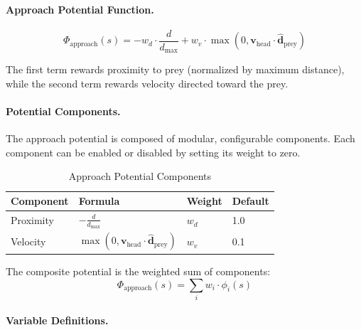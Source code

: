 \documentclass[11pt]{article}
\begin{document}
\paragraph{Approach Potential Function.}
\begin{equation}
    \Phi_{\text{approach}}(s) = -w_d \cdot \frac{d}{d_{\max}} + w_v \cdot \max(0, \mathbf{v}_{\text{head}} \cdot \hat{\mathbf{d}}_{\text{prey}})
\end{equation}

The first term rewards proximity to prey (normalized by maximum distance), while the second term rewards velocity directed toward the prey.

\paragraph{Potential Components.}
The approach potential is composed of modular, configurable components. Each component can be enabled or disabled by setting its weight to zero.

\begin{table}[H]
\centering
\caption{Approach Potential Components}
\begin{tabular}{@{}llll@{}}
\toprule
\textbf{Component} & \textbf{Formula} & \textbf{Weight} & \textbf{Default} \\
\midrule
Proximity & $-\frac{d}{d_{\max}}$ & $w_d$ & 1.0 \\
Velocity & $\max(0, \mathbf{v}_{\text{head}} \cdot \hat{\mathbf{d}}_{\text{prey}})$ & $w_v$ & 0.1 \\
\bottomrule
\end{tabular}
\end{table}

The composite potential is the weighted sum of components:
\begin{equation}
    \Phi_{\text{approach}}(s) = \sum_{i} w_i \cdot \phi_i(s)
\end{equation}

\paragraph{Variable Definitions.}
\end{document}
